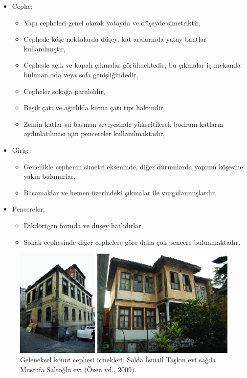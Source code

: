 \documentclass[12pt,turkish,a4paperpaper,]{report}
\providecommand{\tightlist}{%
  \setlength{\itemsep}{0pt}\setlength{\parskip}{0pt}}
\begin{document}
\begin{itemize}
\tightlist
\item
  Cephe;

  \begin{itemize}
  \tightlist
  \item
    Yapı cepheleri genel olarak yatayda ve düşeyde simetriktir,
  \item
    Cephede köşe noktalarda düşey, kat aralarında yatay bantlar
    kullanılmıştır,
  \item
    Cephede açık ve kapalı çıkmalar görülmektedir, bu çıkmalar iç
    mekanda bulunan oda veya sofa genişliğindedir,
  \item
    Cepheler sokağa paraleldir,
  \item
    Beşik çatı ve ağırlıkla kırma çatı tipi hakimdir,
  \item
    Zemin katlar su basman seviyesinde yükseltilerek bodrum katların
    aydınlatılması için pencereler kullanılmaktadır,
  \end{itemize}
\item
  Giriş;

  \begin{itemize}
  \tightlist
  \item
    Genellikle cephenin simetri ekseninde, diğer durumlarda yapının
    köşesine yakın bulunurlar,
  \item
    Basamaklar ve hemen üzerindeki çıkmalar ile vurgulanmışlardır,
  \end{itemize}
\item
  Pencereler;

  \begin{itemize}
  \tightlist
  \item
    Dikdörtgen formda ve düşey hatlıdırlar,
  \item
    Sokak cephesinde diğer cephelere göre daha çok pencere
    bulunmaktadır.
  \end{itemize}
\end{itemize}

\begin{figure}
\centering
\includegraphics[width=1\textwidth,height=\textheight]{source/figures/KonutCepheleri.jpg}
\caption{Geleneksel konut cephesi örnekleri. Solda İsmail Taşkın evi
sağda Mustafa Saltoğlu evi (Özen vd., 2009).}
\end{figure}
\end{document}
